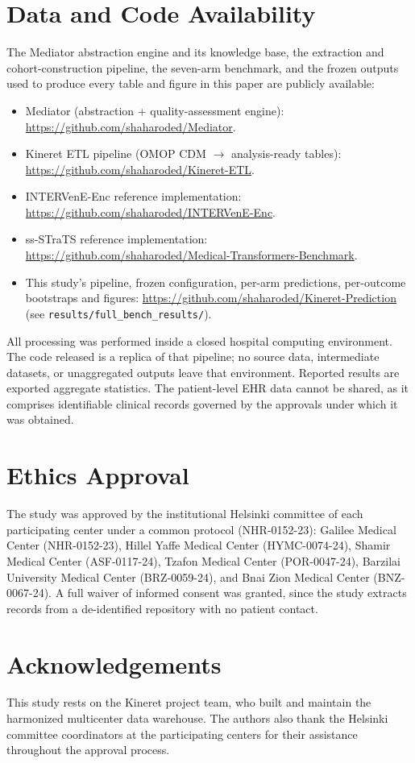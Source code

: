 \documentclass[preprint,12pt]{elsarticle}
\begin{document}
\section*{Data and Code Availability}
The Mediator abstraction engine and its knowledge base, the extraction and
cohort-construction pipeline, the seven-arm benchmark, and the frozen
outputs used to produce every table and figure in this paper are publicly
available:

\begin{itemize}\setlength{\itemsep}{.1em}
\item Mediator (abstraction + quality-assessment engine):
      \url{https://github.com/shaharoded/Mediator}.
\item Kineret ETL pipeline (OMOP CDM $\to$ analysis-ready tables):
      \url{https://github.com/shaharoded/Kineret-ETL}.
\item INTERVenE-Enc reference implementation:
      \url{https://github.com/shaharoded/INTERVenE-Enc}.
\item ss-STraTS reference implementation:
      \url{https://github.com/shaharoded/Medical-Transformers-Benchmark}.
\item This study's pipeline, frozen configuration, per-arm predictions,
      per-outcome bootstraps and figures:
      \url{https://github.com/shaharoded/Kineret-Prediction} (see
      \texttt{results/full\_bench\_results/}).
\end{itemize}

All processing was performed inside a closed hospital computing environment.
The code released is a replica of that pipeline; no source data,
intermediate datasets, or unaggregated outputs leave that environment.
Reported results are exported aggregate statistics. The patient-level EHR
data cannot be shared, as it comprises identifiable clinical records
governed by the approvals under which it was obtained.

\section*{Ethics Approval}
The study was approved by the institutional Helsinki committee of each
participating center under a common protocol (NHR-0152-23): Galilee Medical
Center (NHR-0152-23), Hillel Yaffe Medical Center (HYMC-0074-24), Shamir
Medical Center (ASF-0117-24), Tzafon Medical Center (POR-0047-24), Barzilai
University Medical Center (BRZ-0059-24), and Bnai Zion Medical Center
(BNZ-0067-24). A full waiver of informed consent was granted, since the
study extracts records from a de-identified repository with no patient
contact.

\section*{Acknowledgements}
This study rests on the Kineret project team, who built and maintain the
harmonized multicenter data warehouse. The authors also thank the Helsinki
committee coordinators at the participating centers for their assistance
throughout the approval process.



\end{document}
